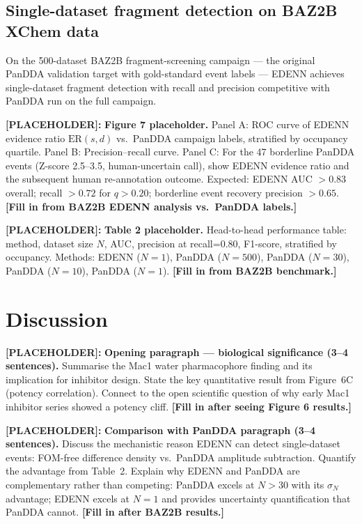 \documentclass[10pt,twocolumn]{article}
\newcommand{\placeholder}[1]{%
  \begin{mdframed}[
    linecolor=placeholder,linewidth=1pt,
    backgroundcolor=red!5,
    innertopmargin=6pt,innerbottommargin=6pt,
    innerleftmargin=8pt,innerrightmargin=8pt]
  \small\color{placeholder}\textbf{[PLACEHOLDER]:} #1
  \end{mdframed}
}
\begin{document}
\subsection{Single-dataset fragment detection on BAZ2B XChem data}

On the 500-dataset BAZ2B fragment-screening campaign — the original
PanDDA validation target with gold-standard event labels — EDENN
achieves single-dataset fragment detection with recall and precision
competitive with PanDDA run on the full campaign.

\placeholder{
\textbf{Figure 7 placeholder.}
Panel A: ROC curve of EDENN evidence ratio $\mathrm{ER}(s,d)$
vs.\ PanDDA campaign labels, stratified by occupancy quartile.
Panel B: Precision--recall curve.
Panel C: For the 47 borderline PanDDA events (Z-score 2.5--3.5,
human-uncertain call), show EDENN evidence ratio and the
subsequent human re-annotation outcome.
Expected: EDENN AUC $> 0.83$ overall; recall $> 0.72$ for
$q > 0.20$; borderline event recovery precision $> 0.65$.
\textbf{[Fill in from BAZ2B EDENN analysis vs.\ PanDDA labels.]}
}

\placeholder{
\textbf{Table 2 placeholder.}
Head-to-head performance table: method, dataset size $N$,
AUC, precision at recall=0.80, F1-score, stratified by occupancy.
Methods: EDENN ($N=1$), PanDDA ($N=500$), PanDDA ($N=30$),
PanDDA ($N=10$), PanDDA ($N=1$).
\textbf{[Fill in from BAZ2B benchmark.]}
}

\section{Discussion}

\placeholder{
\textbf{Opening paragraph — biological significance (3--4 sentences).}
Summarise the Mac1 water pharmacophore finding and its implication
for inhibitor design.
State the key quantitative result from Figure~6C (potency
correlation).
Connect to the open scientific question of why early Mac1 inhibitor
series showed a potency cliff.
\textbf{[Fill in after seeing Figure 6 results.]}
}

\placeholder{
\textbf{Comparison with PanDDA paragraph (3--4 sentences).}
Discuss the mechanistic reason EDENN can detect single-dataset
events: FOM-free difference density vs.\ PanDDA amplitude subtraction.
Quantify the advantage from Table~2.
Explain why EDENN and PanDDA are complementary rather than
competing: PanDDA excels at $N > 30$ with its $\sigma_N$ advantage;
EDENN excels at $N=1$ and provides uncertainty quantification
that PanDDA cannot.
\textbf{[Fill in after BAZ2B results.]}
}
\end{document}
